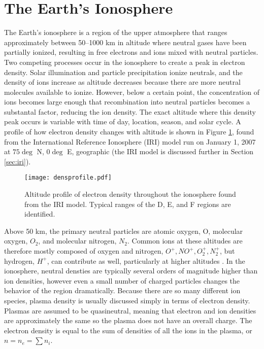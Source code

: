 \section{The Earth's Ionosphere}
\label{sec:ionosphere}
The Earth's ionosphere is a region of the upper atmosphere that ranges approximately between 50--1000 km in altitude where neutral gases have been partially ionized, resulting in free electrons and ions mixed with neutral particles.  Two competing processes occur in the ionosphere to create a peak in electron density.  Solar illumination and particle precipitation ionize neutrals, and the density of ions increase as altitude decreases because there are more neutral molecules available to ionize.  However, below a certain point, the concentration of ions becomes large enough that recombination into neutral particles becomes a substantal factor, reducing the ion density.  The exact altitude where this density peak occurs is variable with time of day, location, season, and solar cycle.  A profile of how electron density changes with altitude is shown in Figure \ref{fig:densprofile}, found from the International Reference Ionosphere (IRI) model run on January 1, 2007 at \(75\deg\) N, \(0\deg\) E, geographic (the IRI model is discussed further in Section \ref{sec:iri}).

\begin{figure}
	\texttt{[image: densprofile.pdf]}
	\caption{Altitude profile of electron density throughout the ionosphere found from the IRI model.  Typical ranges of the D, E, and F regions are identified.}
	\label{fig:densprofile}
\end{figure}

Above 50 km, the primary neutral particles are atomic oxygen, O, molecular oxygen, \(O_2\), and molecular nitrogen, \(N_2\).  Common ions at these altitudes are therefore mostly composed of oxygen and nitrogen, \(O^+, NO^+, O_2^+, N_2^+\), but hydrogen, \(H^+\), can contribute as well, particularly at higher altitudes \citep{Kelley2009}.  In the ionosphere, neutral densties are typically several orders of magnitude higher than ion densities, however even a small number of charged particles changes the behavior of the region dramatically.  Because there are so many different ion species, plasma density is usually discussed simply in terms of electron density.  Plasmas are assumed to be quasineutral, meaning that electron and ion densities are approximately the same so the plasma does not have an overall charge.  The electron density is equal to the sum of densities of all the ions in the plasma, or \(n = n_e = \sum n_i\).

